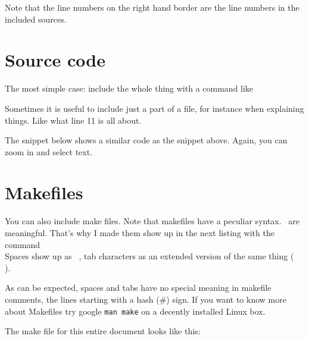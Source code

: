 Note that the line numbers on the right hand border are the line
numbers in the included sources.

\section{Source code}
The most simple case: include the whole thing with a command like \\
\verb##


Sometimes it is useful to include just a part of a file, for instance
when explaining things. Like what line 11 is all about.\\
\verb##



The snippet below shows a similar code as the snippet above.
Again, you can zoom in and select text.




\section{Makefiles}
\label{sec:makefiles}
You can also include make files.
Note that makefiles have a peculiar syntax. \ are meaningful. 
That's why I made them show up in the next listing with the command\\

\lstset{showspaces=true,showtabs=true}
Spaces show up as \lstinline| |, tab characters as an extended version
of the same thing (\lstinline|	|). 

As can be expected, spaces and tabs have no special meaning in
makefile comments, the lines starting with a hash (\#) sign. 
If you want to know more about Makefiles try google
\texttt{man make} on a decently installed Linux box.  

The make file for this entire document looks like this:



